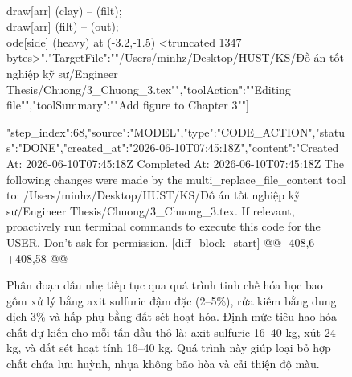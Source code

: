 \begin{figure}[htbp]
{{{\\draw[arr] (clay) -- (filt);\
\\draw[arr] (filt) -- (out);\
\
\\
ode[side] (heavy) at (-3.2,-1.5) {
<truncated 1347 bytes>","TargetFile":""/Users/minhz/Desktop/HUST/KS/Đồ án tốt nghiệp kỹ sư/Engineer Thesis/Chuong/3_Chuong_3.tex"","toolAction":""Editing file"","toolSummary":""Add figure to Chapter 3""}}]}
{"step_index":68,"source":"MODEL","type":"CODE_ACTION","status":"DONE","created_at":"2026-06-10T07:45:18Z","content":"Created At: 2026-06-10T07:45:18Z
Completed At: 2026-06-10T07:45:18Z
The following changes were made by the multi_replace_file_content tool to: /Users/minhz/Desktop/HUST/KS/Đồ án tốt nghiệp kỹ sư/Engineer Thesis/Chuong/3_Chuong_3.tex. If relevant, proactively run terminal commands to execute this code for the USER. Don't ask for permission.
[diff_block_start]
@@ -408,6 +408,58 @@
 
 Phân đoạn dầu nhẹ tiếp tục qua quá trình tinh chế hóa học bao gồm xử lý bằng axit sulfuric đậm đặc (2--5\%), rửa kiềm bằng dung dịch  3\% và hấp phụ bằng đất sét hoạt hóa. Định mức tiêu hao hóa chất dự kiến cho mỗi tấn dầu thô là: axit sulfuric 16--40 kg, xút  24 kg, và đất sét hoạt tính 16--40 kg. Quá trình này giúp loại bỏ hợp chất chứa lưu huỳnh, nhựa không bão hòa và cải thiện độ màu.
 
}}
\end{figure}
